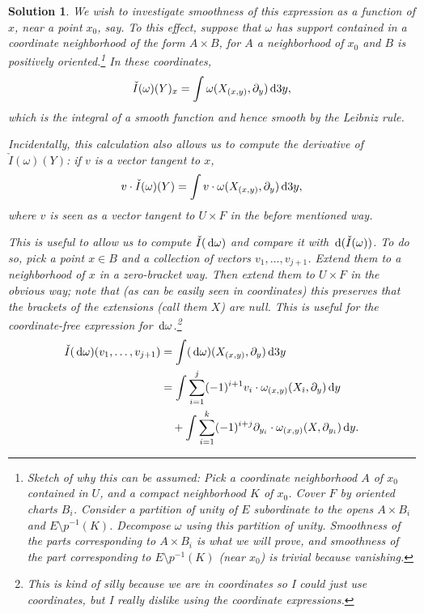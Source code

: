 \documentclass{article}
\theoremstyle{nonumberplain}
\newtheorem{sol}{Solution}
\begin{document}
\begin{sol}
We wish to investigate smoothness of this expression as a function of $x$, near a point $x_0$, say. To this effect, suppose that $\omega$ has support contained in a coordinate neighborhood of the form $A \times B$, for $A$ a neighborhood of $x_0$ and $B$ is positively oriented.\footnote{Sketch of why this can be assumed: Pick a coordinate neighborhood $A$ of $x_0$ contained in $U$, and a compact neighborhood $K$ of $x_0$. Cover $F$ by oriented charts $B_i$. Consider a partition of unity of $E$ subordinate to the opens $A \times B_i$ and $E \setminus p^{-1}(K)$. Decompose $\omega$ using this partition of unity. Smoothness of the parts corresponding to $A \times B_i$ is what we will prove, and smoothness of the part corresponding to $E \setminus p^{-1}(K)$ (near $x_0$) is trivial because vanishing.} In these coordinates,
\[\check I(\omega)(Y)_x = \int \omega(X_{(x,y)}, \partial_y) \dl3 y,\]
which is the integral of a smooth function and hence smooth by the Leibniz rule.

Incidentally, this calculation also allows us to compute the derivative of $\check I(\omega)(Y)$: if $v$ is a vector tangent to $x$,
\[v \cdot \check I(\omega)(Y) = \int v \cdot \omega(X_{(x,y)}, \partial_y) \dl3 y,\]
where $v$ is seen as a vector tangent to $U \times F$ in the before mentioned way.

This is useful to allow us to compute $\check I(\dl \omega)$ and compare it with $\dl(\check I(\omega))$. To do so, pick a point $x \in B$ and a collection of vectors $v_1, \dots, v_{j+1}$. Extend them to a neighborhood of $x$ \emph{in a zero-bracket way}. Then extend them to $U \times F$ in the obvious way; note that (as can be easily seen in coordinates) this preserves that the brackets of the extensions (call them $X$) are null. This is useful for the coordinate-free expression for $\dl \omega$.\footnote{This is kind of silly because we are in coordinates so I could just use coordinates, but I really dislike using the coordinate expressions.}
\begin{align*}
\check I(\dl \omega)(v_1, \dots, v_{j+1}) &= \int (\dl \omega)(X_{(x,y)}, \partial_y) \dl3 y\\
&\begin{multlined}
= \int \sum_{i=1}^j (-1)^{i+1} v_i \cdot \omega_{(x,y)}(X_{\hat\imath}, \partial_y) \dl y\\
+ \int \sum_{i=1}^k (-1)^{i+j} \partial_{y_i} \cdot \omega_{(x,y)}(X, \partial_{y_{\hat\imath}}) \dl y.
\end{multlined}
\end{align*}


\end{sol}
\end{document}
